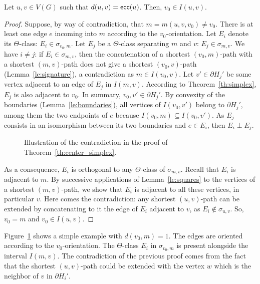 \documentclass[a4paper,UKenglish,numberwithinsect,cleveref, autoref]{lipics-v2021}
\newcommand{\ecc}{\mbox{\textsf{ecc}}}
\begin{document}
\begin{theorem}
Let $u,v \in V(G)$ such that $d(u,v) = \ecc(u)$. Then, $v_0 \in I(u,v)$.
\label{th:center_simplex}
\end{theorem}
\begin{proof}
Suppose, by way of contradiction, that $m = m(u,v,v_0) \neq v_0$. There is at least one edge $e$ incoming into $m$ according to the $v_0$-orientation. Let $E_i$ denote its $\Theta$-class: $E_i \in \sigma_{v_0,m}$. Let $E_j$ be a $\Theta$-class separating $m$ and $v$: $E_j \in \sigma_{m,v}$. We have $i \neq j$: if $E_i \in \sigma_{m,v}$, then the concatenation of a shortest $(v_0,m)$-path with a shortest $(m,v)$-path does not give a shortest $(v_0,v)$-path (Lemma~\ref{le:signature}), a contradiction as $m \in I(v_0,v)$. Let $v' \in \partial H_j'$ be some vertex adjacent to an edge of $E_j$ in $I(m,v)$. According to Theorem~\ref{th:simplex}, $E_j$ is also adjacent to $v_0$. In summary, $v_0,v' \in \partial H_j'$. By convexity of the boundaries (Lemma~\ref{le:boundaries}), all vertices of $I(v_0,v')$ belong to $\partial H_j'$, among them the two endpoints of $e$ because $I(v_0,m) \subseteq I(v_0,v')$. As $E_j$ consists in an isomorphism between its two boundaries and $e \in E_i$, then $E_i \perp E_j$.

\begin{figure}[h]
\centering
\scalebox{0.8}{}
\caption{Illustration of the contradiction in the proof of Theorem~\ref{th:center_simplex}.}
\label{fig:center_simplex}
\end{figure}

As a consequence, $E_i$ is orthogonal to any $\Theta$-class of $\sigma_{m,v}$. Recall that $E_i$ is adjacent to $m$. By successive applications of Lemma~\ref{le:squares} to the vertices of a shortest $(m,v)$-path, we show that $E_i$ is adjacent to all these vertices, in particular $v$. 
Here comes the contradiction: any shortest $(u,v)$-path can be extended by concatenating to it the edge of $E_i$ adjacent to $v$, as $E_i \notin \sigma_{u,v}$. So, $v_0 = m$ and $v_0 \in I(u,v)$. 
\end{proof}

Figure~\ref{fig:center_simplex} shows a simple example with $d(v_0,m) = 1$. The edges are oriented according to the $v_0$-orientation. The $\Theta$-class $E_i$ in $\sigma_{v_0,m}$ is present alongside the interval $I(m,v)$. The contradiction of the previous proof comes from the fact that the shortest $(u,v)$-path could be extended with the vertex $w$ which is the neighbor of $v$ in $\partial H_i'$.
\end{document}

